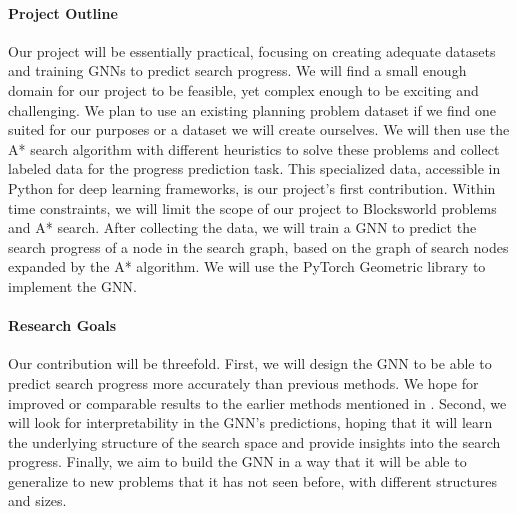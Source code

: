 \documentclass[12pt]{article}
\begin{document}
\paragraph{Project Outline} Our project will be essentially practical, focusing on creating adequate datasets and training GNNs to predict search progress. We will find a small enough domain for our project to be feasible, yet complex enough to be exciting and challenging. We plan to use an existing planning problem dataset if we find one suited for our purposes or a dataset we will create ourselves. We will then use the A* search algorithm with different heuristics to solve these problems and collect labeled data for the progress prediction task. This specialized data, accessible in Python for deep learning frameworks, is our project's first contribution. Within time constraints, we will limit the scope of our project to Blocksworld problems and A* search.
After collecting the data, we will train a GNN to predict the search progress of a node in the search graph, based on the graph of search nodes expanded by the A* algorithm. We will use the PyTorch Geometric library to implement the GNN.

\paragraph{Research Goals} Our contribution will be threefold. First, we will design the GNN to be able to predict search progress more accurately than previous methods. We hope for improved or comparable results to the earlier methods mentioned in \citet{sudry2022learning}. Second, we will look for interpretability in the GNN's predictions, hoping that it will learn the underlying structure of the search space and provide insights into the search progress. Finally, we aim to build the GNN in a way that it will be able to generalize to new problems that it has not seen before, with different structures and sizes.




\end{document}
